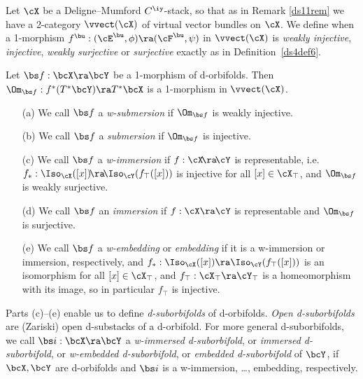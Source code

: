 \documentclass{article}
\begin{document}
\begin{dfn} Let $\cX$ be a Deligne--Mumford $C^\iy$-stack, so that
as in Remark \ref{ds11rem} we have a 2-category $\vvect(\cX)$ of
virtual vector bundles on $\cX$. We define when a 1-morphism
$f^\bu:(\cE^\bu,\phi)\ra(\cF^\bu,\psi)$ in $\vvect(\cX)$ is {\it
weakly injective}, {\it injective}, {\it weakly surjective\/} or
{\it surjective\/} exactly as in Definition~\ref{ds4def6}.   

Let $\bs f:\bcX\ra\bcY$ be a 1-morphism of d-orbifolds. Then
$\Om_{\bs f}:f^*(T^*\bcY)\ra T^*\bcX$ is a 1-morphism in
$\vvect(\cX)$.
\begin{itemize}
\setlength{\itemsep}{0pt}
\setlength{\parsep}{0pt}
\item[(a)] We call $\bs f$ a {\it w-submersion\/} if $\Om_{\bs
f}$ is weakly injective.
\item[(b)] We call $\bs f$ a {\it submersion\/} if $\Om_{\bs
f}$ is injective.
\item[(c)] We call $\bs f$ a {\it w-immersion\/} if
$f:\cX\!\ra\!\cY$ is representable, i.e.\ $f_*:\Iso_\cX([x])
\!\ra\!\Iso_\cY(f_\top([x]))$ is injective for all
$[x]\in\cX_\top$, and $\Om_{\bs f}$ is weakly surjective.
\item[(d)] We call $\bs f$ an {\it immersion\/} if
$f:\cX\ra\cY$ is representable and $\Om_{\bs f}$ is surjective.
\item[(e)] We call $\bs f$ a {\it w-embedding\/} or {\it
embedding\/} if it is a w-immersion or immersion, respectively,
and $f_*:\Iso_\cX([x])\ra\Iso_\cY(f_\top([x]))$ is an
isomorphism for all $[x]\in\cX_\top$, and
$f_\top:\cX_\top\ra\cY_\top$ is a homeomorphism with its image,
so in particular $f_\top$ is injective.
\end{itemize}

Parts (c)--(e) enable us to define {\it
d-suborbifolds\/} of d-orbifolds. {\it
Open d-suborbifolds\/} are (Zariski) open d-substacks of a
d-orbifold. For more general d-suborbifolds, we call $\bs
i:\bcX\ra\bcY$ a {\it w-immersed d-suborbifold}, or {\it immersed
d-suborbifold}, or {\it w-embedded d-suborbifold}, or {\it embedded
d-suborbifold\/} of $\bcY$, if $\bcX,\bcY$ are d-orbifolds and $\bs
i$ is a w-immersion, \ldots, embedding, respectively.
\label{ds11def2}
\end{dfn}
\end{document}
